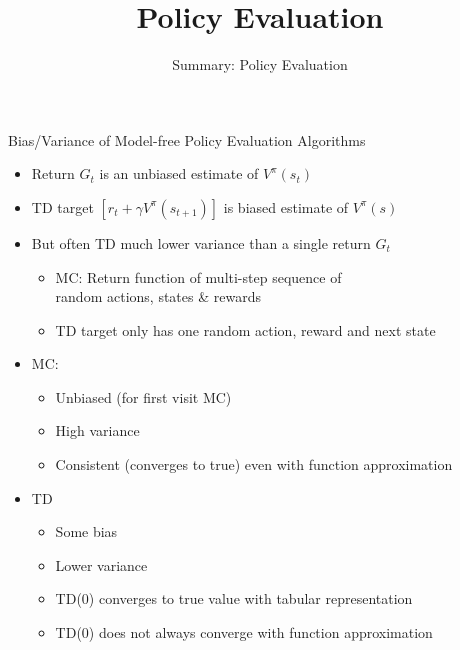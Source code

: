 


\title[Reinforcement Learning: Policy Evaluation]{Policy Evaluation}
\subtitle{Summary: Policy Evaluation}




	
	\maketitle

\begin{frame}[c]{Bias/Variance of Model-free Policy Evaluation Algorithms}

\begin{itemize}
	\item Return $G_t$ is an unbiased estimate of $V^\pi(s_t)$
	\item TD target $[r_t + \gamma V^\pi(s_{t+1})]$ is biased estimate of $V^\pi(s)$ 
	\item But often TD much lower variance than a single return $G_t$
	\begin{itemize}
		\item MC: Return function of multi-step sequence of \\ random actions, states \& rewards
		\item TD target only has one random action, reward and next state
	\end{itemize}
	\pause
	\item MC:
	\begin{itemize}
		\item Unbiased (for first visit MC)
		\item High variance
		\item Consistent (converges to true) even with function approximation
	\end{itemize}
	\pause
	\item TD
	\begin{itemize}
		\item Some bias
		\item Lower variance
		\item TD(0) converges to true value with tabular representation
		\item TD(0) does not always converge with function approximation
	\end{itemize}
\end{itemize}
	
\end{frame}
